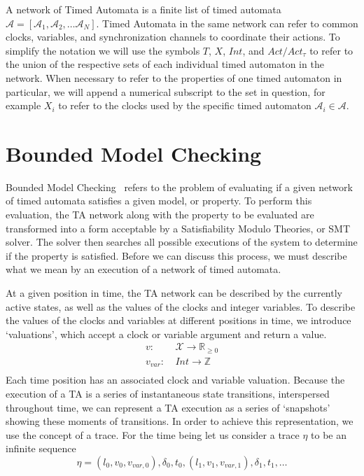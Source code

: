\documentclass[a4paper,11pt]{report}
\theoremstyle{definition}
\begin{document}
A network of Timed Automata is a finite list of timed automata \(\mathcal{A} =
[\mathcal{A}_1, \mathcal{A}_2, \ldots \mathcal{A}_N]\). Timed Automata in the
same network can refer to common clocks, variables, and synchronization channels
to coordinate their actions. To simplify the notation we will use the symbols
\(T\), \(X\), \(Int\), and \(Act/Act_{\tau}\) to refer to the union of the respective
sets of each individual timed automaton in the network. When necessary to refer
to the properties of one timed automaton in particular, we will append a
numerical subscript to the set in question, for example \(X_i\) to refer to the
clocks used by the specific timed automaton \(\mathcal{A}_{i} \in \mathcal{A}\).

\section{Bounded Model Checking}\label{bounded-sat}

%

Bounded Model Checking~\cite{bouyer09} refers to the problem of evaluating if a
given network of timed automata satisfies a given model, or property. To perform
this evaluation, the TA network along with the property to be evaluated are
transformed into a form acceptable by a Satisfiability Modulo Theories, or SMT
solver. The solver then searches all possible executions of the system to
determine if the property is satisfied. Before we can discuss this process, we
must describe what we mean by an execution of a network of timed automata.

At a given position in time, the TA network can be described by the currently
active states, as well as the values of the clocks and integer variables.
To describe the values of the clocks and variables at different positions in
time, we introduce `valuations', which accept a clock or variable argument and
return a value.
\begin{align*}
  v : &\ \mathcal{X} \rightarrow \mathbb{R}_{\geq 0} \\
  v_{var} : &\ Int \rightarrow \mathbb{Z} \\
\end{align*}
Each time position has an associated clock and variable valuation.
Because the execution of a TA is a series of instantaneous state transitions,
interspersed throughout time, we can represent a TA execution as a series of
`snapshots' showing these moments of transitions. In order to achieve this
representation, we use the concept of a trace.
 For the time being let us consider a trace $\eta$ to be an infinite sequence
  \[\eta = (l_{0},v_{0},v_{var,0}),\delta_{0},t_{0},(l_{1},v_{1},v_{var,1}),\delta_{1},t_{1}, \ldots\]
\end{document}
